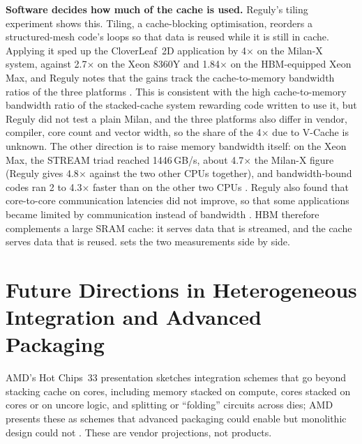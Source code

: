 \textbf{Software decides how much of the cache is used.} Reguly's tiling experiment shows this. Tiling, a cache-blocking optimisation, reorders a structured-mesh code's loops so that data is reused while it is still in cache. Applying it sped up the CloverLeaf~2D application by 4$\times$ on the Milan-X system, against 2.7$\times$ on the Xeon 8360Y and 1.84$\times$ on the HBM-equipped Xeon Max, and Reguly notes that the gains track the cache-to-memory bandwidth ratios of the three platforms \cite{regulyComparativeEvaluationBandwidthbound2023}. This is consistent with the high cache-to-memory bandwidth ratio of the stacked-cache system rewarding code written to use it, but Reguly did not test a plain Milan, and the three platforms also differ in vendor, compiler, core count and vector width, so the share of the 4$\times$ due to V-Cache is unknown. The other direction is to raise memory bandwidth itself: on the Xeon Max, the STREAM triad reached 1446\,GB/s, about 4.7$\times$ the Milan-X figure (Reguly gives 4.8$\times$ against the two other CPUs together), and bandwidth-bound codes ran 2 to 4.3$\times$ faster than on the other two CPUs \cite{regulyComparativeEvaluationBandwidthbound2023}. Reguly also found that core-to-core communication latencies did not improve, so that some applications became limited by communication instead of bandwidth \cite{regulyComparativeEvaluationBandwidthbound2023}. HBM therefore complements a large SRAM cache: it serves data that is streamed, and the cache serves data that is reused.  sets the two measurements side by side.




\section{Future Directions in Heterogeneous Integration and Advanced Packaging}
\label{sec:future}

AMD's Hot Chips~33 presentation sketches integration schemes that go beyond stacking cache on cores, including memory stacked on compute, cores stacked on cores or on uncore logic, and splitting or ``folding'' circuits across dies; AMD presents these as schemes that advanced packaging could enable but monolithic design could not \cite{swaminathanAdvancedPackagingEnabling2021}. These are vendor projections, not products.

